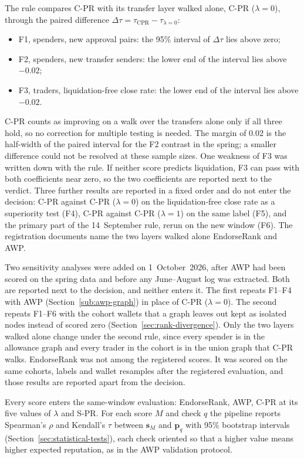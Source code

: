 The rule compares C-PR with its transfer layer walked alone, C-PR ($\lambda=0$), through the paired difference $\Delta\tau=\tau_{\mathrm{CPR}}-\tau_{\lambda=0}$:
\begin{itemize}
\item F1, spenders, new approval pairs: the 95\% interval of $\Delta\tau$ lies above zero;
\item F2, spenders, new transfer senders: the lower end of the interval lies above $-0.02$;
\item F3, traders, liquidation-free close rate: the lower end of the interval lies above $-0.02$.
\end{itemize}
C-PR counts as improving on a walk over the transfers alone only if all three hold, so no correction for multiple testing is needed. The margin of 0.02 is the half-width of the paired interval for the F2 contrast in the spring; a smaller difference could not be resolved at these sample sizes. One weakness of F3 was written down with the rule. If neither score predicts liquidation, F3 can pass with both coefficients near zero, so the two coefficients are reported next to the verdict. Three further results are reported in a fixed order and do not enter the decision: C-PR against C-PR ($\lambda=0$) on the liquidation-free close rate as a superiority test (F4), C-PR against C-PR ($\lambda=1$) on the same label (F5), and the primary part of the 14~September rule, rerun on the new window (F6). The registration documents name the two layers walked alone EndorseRank and AWP.

Two sensitivity analyses were added on 1~October~2026, after AWP had been scored on the spring data and before any June--August log was extracted. Both are reported next to the decision, and neither enters it. The first repeats F1--F4 with AWP (Section~\ref{sub:awp-graph}) in place of C-PR ($\lambda=0$). The second repeats F1--F6 with the cohort wallets that a graph leaves out kept as isolated nodes instead of scored zero (Section~\ref{sec:rank-divergence}). Only the two layers walked alone change under the second rule, since every spender is in the allowance graph and every trader in the cohort is in the union graph that C-PR walks. EndorseRank was not among the registered scores. It was scored on the same cohorts, labels and wallet resamples after the registered evaluation, and those results are reported apart from the decision.


Every score enters the same-window evaluation: EndorseRank, AWP, C-PR at its five values of $\lambda$ and S-PR. For each score $M$ and check $q$ the pipeline reports Spearman's $\rho$ and Kendall's $\tau$ between $\mathbf{s}_M$ and $\mathbf{p}_q$ with 95\% bootstrap intervals (Section~\ref{sec:statistical-tests}), each check oriented so that a higher value means higher expected reputation, as in the AWP validation protocol.

